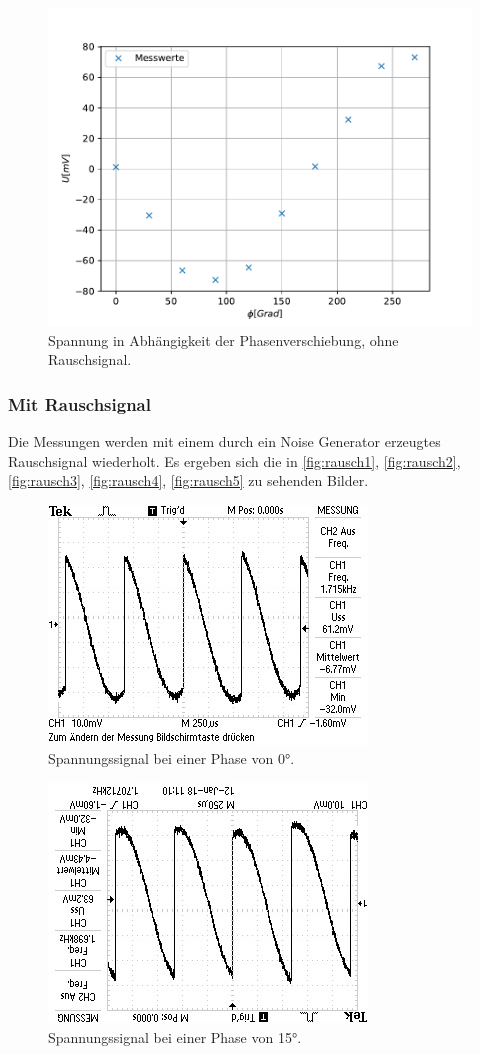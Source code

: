 \begin{figure}[h!tbp]
	\centering
	\includegraphics[width=0.9\linewidth]{klarewerte.pdf}
	\caption{Spannung in Abhängigkeit der Phasenverschiebung, ohne Rauschsignal. }
	\label{fig:klarewerte}
\end{figure}





\pagebreak
\newpage
\subsubsection{Mit Rauschsignal}
Die Messungen werden mit einem durch ein Noise Generator erzeugtes Rauschsignal wiederholt. Es ergeben sich die in \eqref{fig:rausch1}, \eqref{fig:rausch2}, \eqref{fig:rausch3}, \eqref{fig:rausch4}, 
\eqref{fig:rausch5} zu sehenden Bilder.

\begin{figure}[h!tbp]
	\centering
	\includegraphics[angle=-90, width=0.5\linewidth]{rausch1.jpeg}
	\caption{Spannungssignal bei einer Phase von 0°. }
	\label{fig:rausch1}
\end{figure}

\begin{figure}[h!tbp]
	\centering
	\includegraphics[angle=-90, width=0.5\linewidth]{rausch2.jpeg}
	\caption{Spannungssignal bei einer Phase von 15°. }
	\label{fig:rausch2}
\end{figure}

